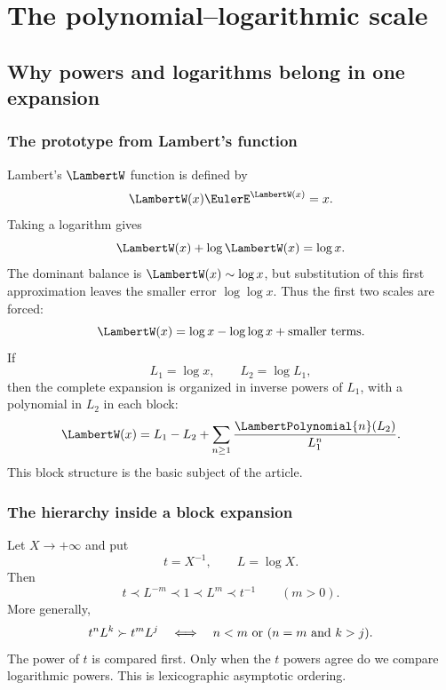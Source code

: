 \documentclass[11pt,oneside]{book}
\theoremstyle{definition}
\theoremstyle{remark}
\newcommand{\precdom}{\prec}
\newcommand{\succdom}{\succ}
\begin{document}
\tableofcontents

\mainmatter

\part{The polynomial--logarithmic scale}

\chapter{Why powers and logarithms belong in one expansion}
\label{ch:scale}

\section{The prototype from Lambert's function}
Lambert's $\LambertW$ function is defined by
\begin{equation}\label{eq:W-def-intro}
 \LambertW(x)\EulerE^{\LambertW(x)}=x.
\end{equation}
Taking a logarithm gives
\begin{equation}\label{eq:W-log-intro}
 \LambertW(x)+\log \LambertW(x)=\log x.
\end{equation}
The dominant balance is $\LambertW(x)\sim\log x$, but substitution of this first
approximation leaves the smaller error $\log\log x$.  Thus the first two
scales are forced:
\[
 \LambertW(x)=\log x-\log\log x+\hbox{smaller terms}.
\]
If
\[
 L_1=\log x,\qquad L_2=\log L_1,
\]
then the complete expansion is organized in inverse powers of $L_1$, with a
polynomial in $L_2$ in each block:
\begin{equation}\label{eq:W-shape-intro}
 \LambertW(x)=L_1-L_2+\sum_{n\ge1}\frac{\LambertPolynomial{n}(L_2)}{L_1^n}.
\end{equation}
This block structure is the basic subject of the article.

\section{The hierarchy inside a block expansion}
Let $X\to+\infty$ and put
\[
 t=X^{-1},\qquad L=\log X.
\]
Then
\[
 t\precdom L^{-m}\precdom 1\precdom L^m\precdom t^{-1}
 \qquad(m>0).
\]
More generally,
\begin{equation}\label{eq:monomial-order}
 t^nL^k\succdom t^mL^j
 \quad\Longleftrightarrow\quad
 n<m\ \hbox{or}\ (n=m\ \hbox{and}\ k>j).
\end{equation}
The power of $t$ is compared first.  Only when the $t$ powers agree do we
compare logarithmic powers.  This is lexicographic asymptotic ordering.
\end{document}
